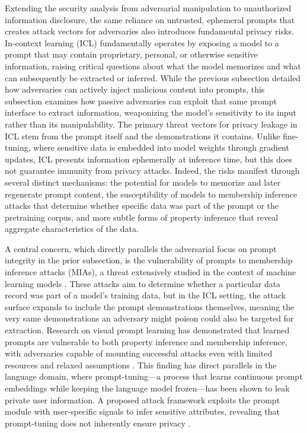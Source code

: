 \documentclass[11pt]{article}
\begin{document}
Extending the security analysis from adversarial manipulation to unauthorized information disclosure, the same reliance on untrusted, ephemeral prompts that creates attack vectors for adversaries also introduces fundamental privacy risks. In-context learning (ICL) fundamentally operates by exposing a model to a prompt that may contain proprietary, personal, or otherwise sensitive information, raising critical questions about what the model memorizes and what can subsequently be extracted or inferred. While the previous subsection detailed how adversaries can actively inject malicious content into prompts, this subsection examines how passive adversaries can exploit that same prompt interface to extract information, weaponizing the model's sensitivity to its input rather than its manipulability. The primary threat vectors for privacy leakage in ICL stem from the prompt itself and the demonstrations it contains. Unlike fine-tuning, where sensitive data is embedded into model weights through gradient updates, ICL presents information ephemerally at inference time, but this does not guarantee immunity from privacy attacks. Indeed, the risks manifest through several distinct mechanisms: the potential for models to memorize and later regenerate prompt content, the susceptibility of models to membership inference attacks that determine whether specific data was part of the prompt or the pretraining corpus, and more subtle forms of property inference that reveal aggregate characteristics of the data.

A central concern, which directly parallels the adversarial focus on prompt integrity in the prior subsection, is the vulnerability of prompts to membership inference attacks (MIAs), a threat extensively studied in the context of machine learning models \cite{ref437,ref438}. These attacks aim to determine whether a particular data record was part of a model's training data, but in the ICL setting, the attack surface expands to include the prompt demonstrations themselves, meaning the very same demonstrations an adversary might poison could also be targeted for extraction. Research on visual prompt learning has demonstrated that learned prompts are vulnerable to both property inference and membership inference, with adversaries capable of mounting successful attacks even with limited resources and relaxed assumptions \cite{ref439}. This finding has direct parallels in the language domain, where prompt-tuning---a process that learns continuous prompt embeddings while keeping the language model frozen---has been shown to leak private user information. A proposed attack framework exploits the prompt module with user-specific signals to infer sensitive attributes, revealing that prompt-tuning does not inherently ensure privacy \cite{ref440}.
\end{document}
